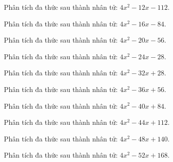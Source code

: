 \begin{bt}
	Phân tích đa thức sau thành nhân tử: $4 x^2 - 12 x - 112$.
\end{bt}
\begin{bt}
	Phân tích đa thức sau thành nhân tử: $4 x^2 - 16 x - 84$.
\end{bt}
\begin{bt}
	Phân tích đa thức sau thành nhân tử: $4 x^2 - 20 x - 56$.
\end{bt}
\begin{bt}
	Phân tích đa thức sau thành nhân tử: $4 x^2 - 24 x - 28$.
\end{bt}
\begin{bt}
	Phân tích đa thức sau thành nhân tử: $4 x^2 - 32 x + 28$.
\end{bt}
\begin{bt}
	Phân tích đa thức sau thành nhân tử: $4 x^2 - 36 x + 56$.
\end{bt}
\begin{bt}
	Phân tích đa thức sau thành nhân tử: $4 x^2 - 40 x + 84$.
\end{bt}
\begin{bt}
	Phân tích đa thức sau thành nhân tử: $4 x^2 - 44 x + 112$.
\end{bt}
\begin{bt}
	Phân tích đa thức sau thành nhân tử: $4 x^2 - 48 x + 140$.
\end{bt}
\begin{bt}
	Phân tích đa thức sau thành nhân tử: $4 x^2 - 52 x + 168$.
\end{bt}
